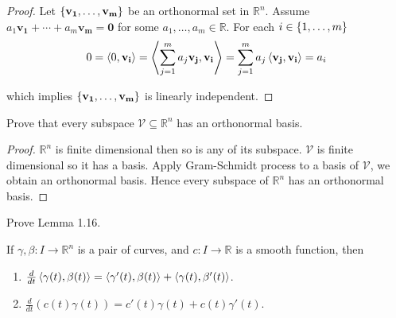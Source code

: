 \begin{proof}
	Let $\left\{{\mathbf{v_{1}}, \ldots, \mathbf{v_{m}}}\right\}$ be an orthonormal set in $\mathbb{R}^{n}$. Assume $a_{1}\mathbf{v_{1}} + \cdots + a_{m}\mathbf{v_{m}} = \mathbf{0}$ for some $a_{1}, \ldots, a_{m} \in \mathbb{R}$. For each $i \in \left\{{1, \ldots, m}\right\}$
	\begin{align*}
		0 = \left\langle{0, \mathbf{v_{i}}}\right\rangle = \left\langle{\sum^{m}_{j=1}a_{j}\mathbf{v_{j}}, \mathbf{v_{i}}}\right\rangle = \sum^{m}_{j=1}a_{j}\left\langle{\mathbf{v_{j}}, \mathbf{v_{i}}}\right\rangle = a_{i}
	\end{align*}

	which implies $\left\{{\mathbf{v_{1}}, \ldots, \mathbf{v_{m}}}\right\}$ is linearly independent.
\end{proof}

\begin{exercise}{1.20}
	Prove that every subspace $\mathcal{V} \subseteq \mathbb{R}^{n}$ has an orthonormal basis.
\end{exercise}

\begin{proof}
	$\mathbb{R}^{n}$ is finite dimensional then so is any of its subspace. $\mathcal{V}$ is finite dimensional so it has a basis. Apply Gram-Schmidt process to a basis of $\mathcal{V}$, we obtain an orthonormal basis. Hence every subspace of $\mathbb{R}^{n}$ has an orthonormal basis.
\end{proof}

\begin{exercise}{1.21}
	Prove Lemma 1.16.

	If $\gamma, \beta: I \to \mathbb{R}^{n}$ is a pair of curves, and $c: I\to \mathbb{R}$ is a smooth function, then
	\begin{enumerate}[label={(\arabic*)}]
		\item $\frac{d}{dt}\left\langle{\gamma(t), \beta(t)}\right\rangle = \left\langle{\gamma'(t), \beta(t)}\right\rangle + \left\langle{\gamma(t), \beta'(t)}\right\rangle$.
		\item $\frac{d}{dt}(c(t)\gamma(t)) = c'(t)\gamma(t) + c(t)\gamma'(t)$.
	\end{enumerate}
\end{exercise}

